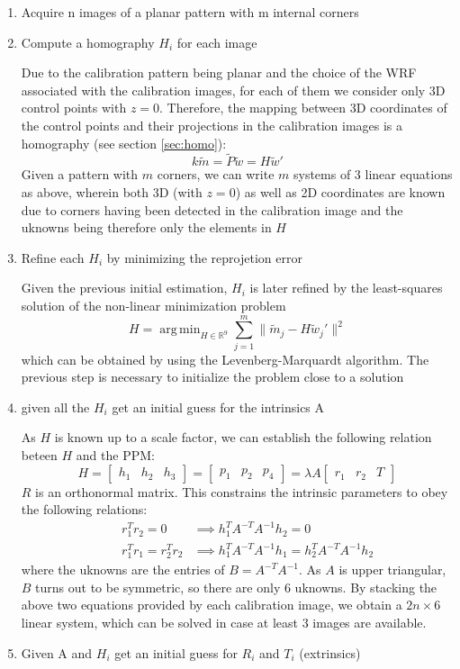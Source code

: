 \documentclass{article}
\newcommand{\R}{\mathbb{R}}
\DeclareMathOperator*{\argmin}{arg\,min}
\begin{document}
\begin{enumerate}
    \item Acquire n images of a planar pattern with m internal corners
    \item Compute a homography $H_i$ for each image

        Due to the calibration pattern being planar and the choice of the WRF associated with the calibration images, for each of them we consider only 3D control points with $z=0$. Therefore, the mapping between 3D coordinates of the control points and their projections in the calibration images is a homography (see section \ref{sec:homo}):
        \[
            k\tilde{m} = \tilde{P}\tilde{w} =  H\tilde{w}'
        \]
        Given a pattern with $m$ corners, we can write $m$ systems of 3 linear equations as above, wherein both 3D (with $z=0$) as well as 2D coordinates are known due to corners having been detected in the calibration image and the uknowns being therefore only the elements in $H$
    \item Refine each $H_i$ by minimizing the reprojetion error

        Given the previous initial estimation, $H_i$ is later refined by the least-squares solution of the non-linear minimization problem 
        \[
            H = \argmin_{H\in\R^9} \displaystyle\sum_{j=1}^{m} \|\tilde{m}_j - H\tilde{w}_j'\|^2
        \]
        which can be obtained by using the Levenberg-Marquardt algorithm. The previous step is necessary to initialize the problem close to a solution
    \item given all the $H_i$ get an initial guess for the intrinsics A

        As $H$ is known up to a scale factor, we can establish the following relation beteen $H$ and the PPM:
        \[
            H = \begin{bmatrix}
                h_1 & h_2 & h_3
            \end{bmatrix} = \begin{bmatrix}
                p_1 & p_2 & p_4
            \end{bmatrix} = \lambda A \begin{bmatrix}
                r_1 & r_2 & T
            \end{bmatrix}
        \]
        $R$ is an orthonormal matrix. This constrains the intrinsic parameters to obey the following relations:
        \begin{align*}
            &&r_1^T r_2 = 0 & \implies h_1^T A^{-T}A^{-1} h_2 = 0\\
            &&r_1^T r_1 = r_2^T r_2 & \implies h_1^T A^{-T}A^{-1} h_1 = h_2^T A^{-T}A^{-1} h_2
        \end{align*}
        where the uknowns are the entries of $B=A^{-T}A^{-1}$. As $A$ is upper triangular, $B$ turns out to be symmetric, so there are only 6 uknowns. By stacking the above two equations provided by each calibration image, we obtain a $2n\times 6$ linear system, which can be solved in case at least 3 images are available.
    \item Given A and $H_i$ get an initial guess for $R_i$ and $T_i$ (extrinsics)


\end{enumerate}
\end{document}
